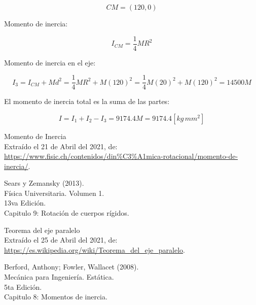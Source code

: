\documentclass[letter,oneside,11pt]{article}
\begin{document}
\begin{minipage}[b]{.9\linewidth}
\begin{equation*}
    CM = (120, 0)
\end{equation*}

Momento de inercia:

\begin{equation*}
    I_{CM} = \frac{1}{4} M R^2
\end{equation*}

Momento de inercia en el eje:

\begin{equation*}
    I_3 = I_{CM} + M d^2 = \frac{1}{4} M R^2 + M (120)^2 = \frac{1}{4} M (20)^2 + M (120)^2 = 14500 M
\end{equation*}

El momento de inercia total es la suma de las partes:

\begin{equation*}
    I = I_1 + I_2 - I_3 = 9174.4 M = 9174.4 [kg\, mm^2]
\end{equation*}

\end{minipage}

\begin{thebibliography}{99}

 Momento de Inercia \\
Extraído el 21 de Abril del 2021, de: \\
\url{https://www.fisic.ch/contenidos/din%C3%A1mica-rotacional/momento-de-inercia/}.
 
 Sears y Zemansky (2013).\\
Física Universitaria. Volumen 1.\\
13va Edición.\\
Capitulo 9: Rotación de cuerpos rígidos.

 Teorema del eje paralelo \\
Extraído el 25 de Abril del 2021, de: \\
\url{https://es.wikipedia.org/wiki/Teorema_del_eje_paralelo}.

 Berford, Anthony; Fowler, Wallacet (2008).\\
Mecánica para Ingeniería. Estática. \\
5ta Edición. \\
Capitulo 8: Momentos de inercia.

\end{thebibliography}
\end{document}

